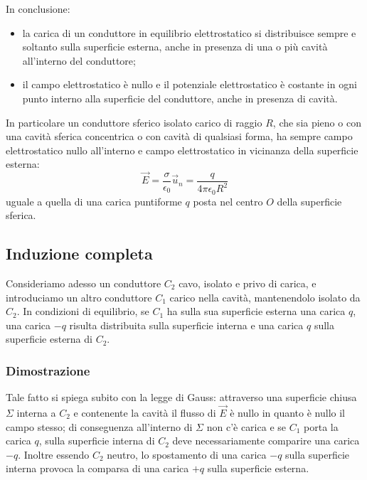\documentclass[class=book, crop=false, oneside, 12pt]{standalone}
\begin{document}
In conclusione:
\begin{itemize}
    \item la carica di un conduttore in equilibrio elettrostatico si distribuisce sempre e soltanto sulla superficie esterna, anche in presenza di una o più cavità all'interno del conduttore; 
    \item il campo elettrostatico è nullo e il potenziale elettrostatico è costante in ogni punto interno alla superficie del conduttore, anche in presenza di cavità.
\end{itemize}

In particolare un conduttore sferico isolato carico di raggio \(R\), che sia pieno o con una cavità sferica concentrica o con cavità di qualsiasi forma, ha sempre campo elettrostatico nullo all'interno e campo elettrostatico in vicinanza della superficie esterna:
\begin{equation*}
    \overrightarrow{E} = \frac{\sigma}{\epsilon_0} \overrightarrow{u}_n = \frac{q}{4 \pi \epsilon_0 R^2}
\end{equation*}
uguale a quella di una carica puntiforme \(q\) posta nel centro \(O\) della superficie sferica. 

\subsection{Induzione completa}

Consideriamo adesso un conduttore \(C_2\) cavo, isolato e privo di carica, e introduciamo un altro conduttore \(C_1\) carico nella cavità, mantenendolo isolato da \(C_2\). 
In condizioni di equilibrio, se \(C_1\) ha sulla sua superficie esterna una carica \(q\), una carica \(- q\) risulta distribuita sulla superficie interna e una carica \(q\) sulla superficie esterna di \(C_2\).

\subsubsection{Dimostrazione}

Tale fatto si spiega subito con la legge di Gauss: attraverso una superficie chiusa \(\Sigma\) interna a \(C_2\) e contenente la cavità il flusso di \(\overrightarrow{E}\) è nullo in quanto è nullo il campo stesso; di conseguenza all'interno di \(\Sigma\) non c'è carica e se \(C_1\) porta la carica \(q\), sulla superficie interna di \(C_2\) deve necessariamente comparire una carica \(-q\). 
Inoltre essendo \(C_2\) neutro, lo spostamento di una carica \(- q\) sulla superficie interna provoca la comparsa di una carica \(+q\) sulla superficie esterna. 
\end{document}
